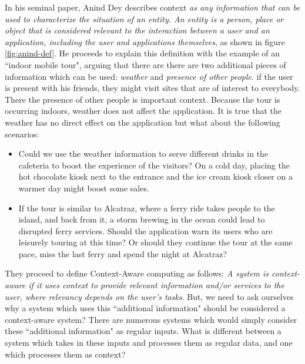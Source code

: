 In his seminal paper, Anind Dey \cite{dey2001understanding} describes context \textit{as any information that can be used to characterize the situation of an entity. An entity is a person, place or object that is considered relevant to the interaction between a user and an application, including the user and applications themselves}, as shown in figure \ref{fig:anind-def}. He proceeds to explain this definition with the example of an ``indoor mobile tour", arguing that there are there are two additional pieces of information which can be used: \textit{weather} and \textit{presence of other people}. if the user is present with his friends, they might visit sites that are of interest to everybody. There the presence of other people is important context. Because the tour is occurring indoors, weather does not affect the application. It is true that the weather has no direct effect on the application but what about the following scenarios:

\begin{itemize}
\item Could we use the weather information to serve different drinks in the cafeteria to boost the experience of the visitors? On a cold day, placing the hot chocolate kiosk next to the entrance and the ice cream kiosk closer on a warmer day might boost some sales.
\item If the tour is similar to Alcatraz, where a ferry ride takes people to the island, and back from it, a storm brewing in the ocean could lead to disrupted ferry services. Should the application warn its users who are leisurely touring at this time? Or should they continue the tour at the same pace, miss the last ferry and spend the night at Alcatraz?
\end{itemize}

They proceed to define Context-Aware computing as follows: \textit{A system is context-aware if it uses context to provide relevant information and/or services to the user, where relevancy depends on the user's tasks}. But, we need to ask ourselves why a system which uses this ``additional information" should be considered a context-aware system? There are numerous systems which would simply consider these ``additional information" as regular inputs. What is different between a system which takes in these inputs and processes them as regular data, and one which processes them as context?

